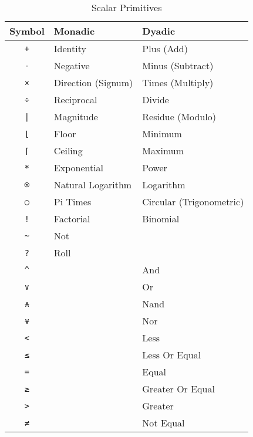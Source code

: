 \documentclass[numbers,preprint]{sigplanconf}
\begin{document}
\begin{table}
\centering
\begin{tabular}{cll}
\toprule
Symbol                   & Monadic            & Dyadic \\
\midrule
\texttt{+}               & Identity           & Plus (Add) \\
\texttt{-}               & Negative           & Minus (Subtract) \\
\texttt{×}               & Direction (Signum) & Times (Multiply) \\
\texttt{÷}               & Reciprocal         & Divide \\
\texttt{|}               & Magnitude          & Residue (Modulo) \\
\texttt{⌊}               & Floor              & Minimum \\
\texttt{⌈}               & Ceiling            & Maximum \\
\texttt{*}               & Exponential        & Power \\
\texttt{⍟}               & Natural Logarithm  & Logarithm \\
\texttt{○}               & Pi Times           & Circular (Trigonometric) \\
\texttt{!}               & Factorial          & Binomial \\
\texttt{\textasciitilde} & Not                & \\
\texttt{?}               & Roll               & \\
\texttt{\^}              &                    & And \\
\texttt{∨}               &                    & Or \\
\texttt{⍲}               &                    & Nand \\
\texttt{⍱}               &                    & Nor \\
\texttt{<}               &                    & Less \\
\texttt{≤}               &                    & Less Or Equal \\
\texttt{=}               &                    & Equal \\
\texttt{≥}               &                    & Greater Or Equal \\
\texttt{>}               &                    & Greater \\
\texttt{≠}               &                    & Not Equal \\
\end{tabular}
\caption{Scalar Primitives}
\label{tab:scalarprims}
\end{table}
\end{document}
